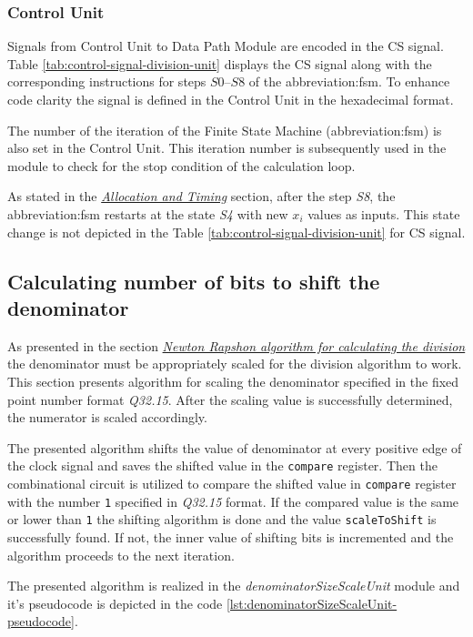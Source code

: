 \documentclass[a4paper, twoside, 11pt]{article}
\newcommand{\fbar}{\FloatBarrier}
\begin{document}
\fbar
\subsubsection{Control Unit}\label{subsubsec:division-control-unit}
Signals from Control Unit to Data Path Module are encoded in the CS signal. Table \ref{tab:control-signal-division-unit} displays the CS signal along with the corresponding instructions for steps $S0$–$S8$ of the \gls{abbreviation:fsm}. To enhance code clarity the signal is defined in the Control Unit in the hexadecimal format.\par
The number of the iteration of the Finite State Machine (\gls{abbreviation:fsm}) is also set in the Control Unit. This iteration number is subsequently used in the module to check for the stop condition of the calculation loop.\par
As stated in the \hyperref[subsubsec:division-allocation-and-timing]{\textit{Allocation and Timing}} section, after the step \textit{S8}, the \gls{abbreviation:fsm} restarts at the state \textit{S4} with new $x_i$ values as inputs. This state change is not depicted in the Table \ref{tab:control-signal-division-unit} for CS signal.


\fbar

\subsection{Calculating number of bits to shift the denominator}\label{subsec:calculating-number-of-bits-to-shift-the-denominator}
As presented in the section \hyperref[subsection:newton-raphson-algorithm-for-calculating-the-division]{\textit{Newton Rapshon algorithm for calculating the division}} the denominator must be appropriately scaled for the division algorithm to work. This section presents algorithm for scaling the denominator specified in the fixed point number format \textit{Q32.15}. After the scaling value is successfully determined, the numerator is scaled accordingly.
\par
The presented algorithm shifts the value of denominator at every positive edge of the clock signal and saves the shifted value in the \texttt{compare} register. Then the combinational circuit is utilized to compare the shifted value in \texttt{compare} register with the number \texttt{1} specified in \textit{Q32.15} format. If the compared value is the same or lower than \texttt{1} the shifting algorithm is done and the value \texttt{scaleToShift} is successfully found. If not, the inner value of shifting bits is incremented and the algorithm proceeds to the next iteration.\par
The presented algorithm is realized in the \textit{denominatorSizeScaleUnit} module and it's pseudocode is depicted in the code \ref{lst:denominatorSizeScaleUnit-pseudocode}.
\end{document}
